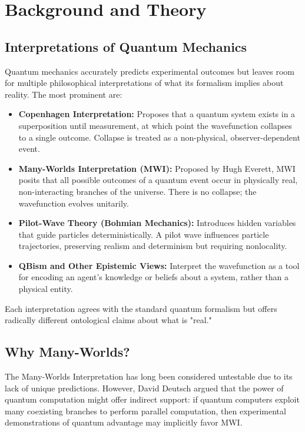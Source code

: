 \documentclass[12pt]{article}
\begin{document}
\section{Background and Theory}

\subsection{Interpretations of Quantum Mechanics}

Quantum mechanics accurately predicts experimental outcomes but leaves room for multiple philosophical interpretations of what its formalism implies about reality. The most prominent are:

\begin{itemize}
  \item \textbf{Copenhagen Interpretation:} Proposes that a quantum system exists in a superposition until measurement, at which point the wavefunction collapses to a single outcome. Collapse is treated as a non-physical, observer-dependent event.
  
  \item \textbf{Many-Worlds Interpretation (MWI):} Proposed by Hugh Everett, MWI posits that all possible outcomes of a quantum event occur in physically real, non-interacting branches of the universe. There is no collapse; the wavefunction evolves unitarily.
  
  \item \textbf{Pilot-Wave Theory (Bohmian Mechanics):} Introduces hidden variables that guide particles deterministically. A pilot wave influences particle trajectories, preserving realism and determinism but requiring nonlocality.
  
  \item \textbf{QBism and Other Epistemic Views:} Interpret the wavefunction as a tool for encoding an agent's knowledge or beliefs about a system, rather than a physical entity.
\end{itemize}

Each interpretation agrees with the standard quantum formalism but offers radically different ontological claims about what is "real."

\subsection{Why Many-Worlds?}

The Many-Worlds Interpretation has long been considered untestable due to its lack of unique predictions. However, David Deutsch argued that the power of quantum computation might offer indirect support: if quantum computers exploit many coexisting branches to perform parallel computation, then experimental demonstrations of quantum advantage may implicitly favor MWI.
\end{document}
